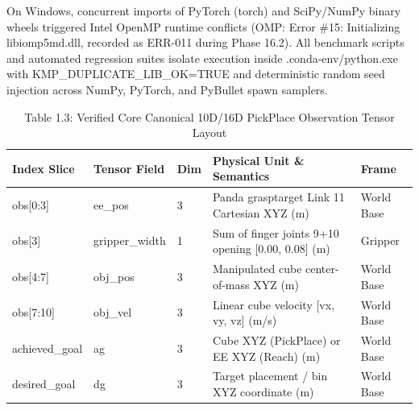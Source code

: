\documentclass[11pt,a4paper,oneside]{book}
\begin{document}
On Windows, concurrent imports of PyTorch (torch) and SciPy/NumPy binary wheels triggered Intel OpenMP runtime conflicts (OMP: Error \#15: Initializing libiomp5md.dll, recorded as ERR-011 during Phase 16.2). All benchmark scripts and automated regression suites isolate execution inside .conda-env/python.exe with KMP\_DUPLICATE\_LIB\_OK=TRUE and deterministic random seed injection across NumPy, PyTorch, and PyBullet spawn samplers.

\begin{longtable}{l l l l l}\caption{Table 1.3: Verified Core Canonical 10D/16D PickPlace Observation Tensor Layout}\\\toprule
Index Slice & Tensor Field & Dim & Physical Unit \& Semantics & Frame \\ \midrule \endhead
obs[0:3] & ee\_pos & 3 & Panda grasptarget Link 11 Cartesian XYZ (m) & World Base \\
obs[3] & gripper\_width & 1 & Sum of finger joints 9+10 opening [0.00, 0.08] (m) & Gripper \\
obs[4:7] & obj\_pos & 3 & Manipulated cube center-of-mass XYZ (m) & World Base \\
obs[7:10] & obj\_vel & 3 & Linear cube velocity [vx, vy, vz] (m/s) & World Base \\
achieved\_goal & ag & 3 & Cube XYZ (PickPlace) or EE XYZ (Reach) (m) & World Base \\
desired\_goal & dg & 3 & Target placement / bin XYZ coordinate (m) & World Base \\
\bottomrule \end{longtable}
\end{document}
